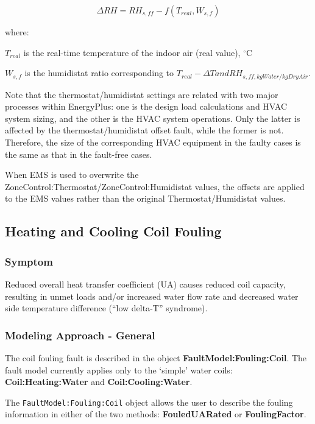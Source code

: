 \begin{equation}
\Delta RH = RH_{s,ff} - f(T_{real}, W_{s,f})
\end{equation}

where:

\(T_{real}\) is the real-time temperature of the indoor air (real value), \(^{\circ}\)C

\(W_{s,f}\) is the humidistat ratio corresponding to \(T_{real} - \Delta T and RH_{s,ff, kgWater/kgDryAir}\).

Note that the thermostat/humidistat settings are related with two major processes within EnergyPlus: one is the design load calculations and HVAC system sizing, and the other is the HVAC system operations. Only the latter is affected by the thermostat/humidistat offset fault, while the former is not. Therefore, the size of the corresponding HVAC equipment in the faulty cases is the same as that in the fault-free cases.

When EMS is used to overwrite the ZoneControl:Thermostat/ZoneControl:Humidistat values, the offsets are applied to the EMS values rather than the original Thermostat/Humidistat values.

\subsection{Heating and Cooling Coil Fouling}\label{heating-and-cooling-coil-fouling}

\subsubsection{Symptom}\label{symptom-2}

Reduced overall heat transfer coefficient (UA) causes reduced coil capacity, resulting in unmet loads and/or increased water flow rate and decreased water side temperature difference (``low delta-T'' syndrome).

\subsubsection{Modeling Approach - General}\label{modeling-approach-2}

The coil fouling fault is described in the object \textbf{FaultModel:Fouling:Coil}. The fault model currently applies only to the `simple' water coils:
\textbf{Coil:Heating:Water} and \textbf{Coil:Cooling:Water}. 

The \lstinline!FaultModel:Fouling:Coil! object allows the user to describe the fouling information in either of the two methods: \textbf{FouledUARated} or \textbf{FoulingFactor}.

